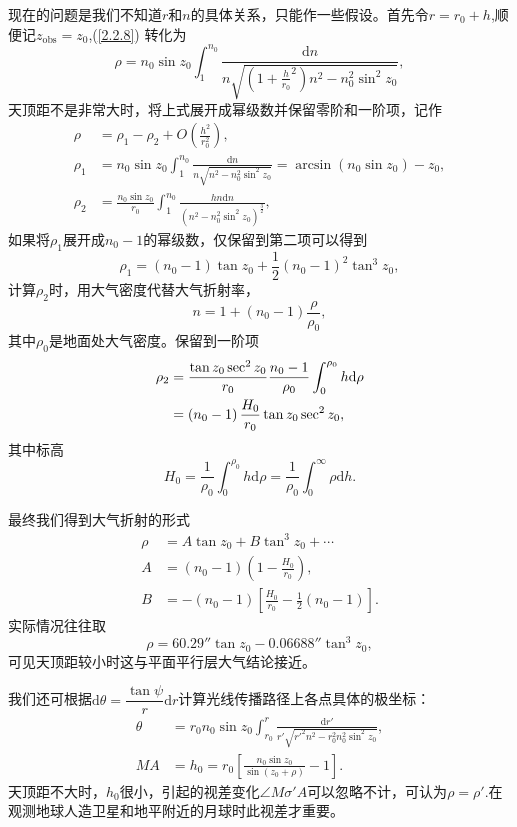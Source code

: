 \documentclass[11pt, a4paper, oneside]{ctexart}
\numberwithin{equation}{subsection}
\begin{document}
现在的问题是我们不知道$r$和$n$的具体关系，只能作一些假设。首先令$r=r_0+h$,顺便记$z_{\text{obs}}=z_{0}$,(\ref{2.2.8}) 转化为
\begin{equation}
\rho=n_0\sin z_0\int_1^{n_0}\frac{\mathrm{d}n}{n\sqrt{\left(1+\frac{h}{r_0}^2\right)n^2-n_0^2\sin^{2}z_0}},
\end{equation}
天顶距不是非常大时，将上式展开成幂级数并保留零阶和一阶项，记作
\begin{align}
\rho&=\rho_1-\rho_2+O\left(\frac{h^2}{r_0^2}\right),\\
\rho_1&=n_0\sin z_0\int_1^{n_0}\frac{\mathrm{d}n}{n\sqrt{n^2-n_0^2\sin^2z_0}}=\arcsin\left(n_0\sin z_0\right)-z_0,\\
\rho_2&=\frac{n_0\sin z_0}{r_0}\int_1^{n_0}\frac{hn\mathrm{d}n}{\left(n^2-n_0^2\sin^2z_0\right)^\frac32},
\end{align}
如果将$\rho_1$展开成$n_0-1$的幂级数，仅保留到第二项可以得到
\begin{equation}
\rho_1=\left(n_0-1\right)\tan z_0+\frac{1}{2}\left(n_0-1\right)^2\tan^3z_0,
\end{equation}
计算$\rho_2$时，用大气密度代替大气折射率，
\begin{equation}
n=1+\left(n_0-1\right)\frac{\rho}{\rho_0},
\end{equation}
其中$\rho_0$是地面处大气密度。保留到一阶项
\begin{align}
\rho_2&=\frac{\tan z_0\sec^2 z_0}{r_0}\frac{n_0-1}{\rho_0}\int_0^{\rho_0}h\mathrm{d}\rho\notag\\
&=\left(n_0-1\right)\frac{H_0}{r_0}\tan z_0\sec^2z_0,
\end{align}
其中标高
\begin{equation}
H_0=\frac{1}{\rho_0}\int_0^{\rho_0}h\mathrm{d}\rho=\frac{1}{\rho_0}\int_0^\infty\rho\mathrm{d}h.
\end{equation}

最终我们得到大气折射的形式
\begin{align}
\rho&=A\tan z_0+B\tan^3z_0+\cdots\\
A&=\left(n_0-1\right)\left(1-\frac{H_0}{r_0}\right),\\
B&=-\left(n_0-1\right)\left[\frac{H_0}{r_0}-\frac{1}{2}\left(n_0-1\right)\right].
\end{align}
实际情况往往取
\begin{equation}
\rho=\ang{;;60.29}\tan z_0-\ang{;;0.06688}\tan^{3}z_{0},
\end{equation}
可见天顶距较小时这与平面平行层大气结论接近。

我们还可根据$\mathrm{d}\theta=\dfrac{\tan\psi}{r}\mathrm{d}r$计算光线传播路径上各点具体的极坐标：
\begin{align}
\theta&=r_0n_0\sin z_0\int_{r_0}^r\frac{\mathrm{d}r'}{r'\sqrt{r'^{2}n^2-r^2_0n_0^2\sin^2z_0}},\\
MA&=h_0=r_0\left[\frac{n_0\sin z_0}{\sin\left(z_0+\rho\right)}-1\right].
\end{align}
天顶距不大时，$h_{0}$很小，引起的视差变化$\angle{M\sigma'A}$可以忽略不计，可认为$\rho=\rho'$.在观测地球人造卫星和地平附近的月球时此视差才重要。
\end{document}
